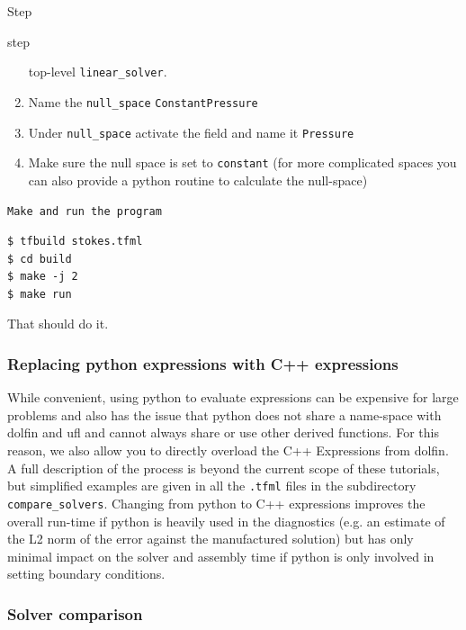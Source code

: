 \begin{steps}{Step}
\begin{steps}{step}
\begin{enumerate}
      top-level \texttt{linear\_solver}.
    \item Name the \texttt{null\_space} \texttt{ConstantPressure}
    \item Under \texttt{null\_space} activate the field and name it \texttt{Pressure}
    \item Make sure the null space is set to \texttt{constant} (for
      more complicated spaces you can also provide a python routine to
      calculate the null-space)
    \end{enumerate}
  \end{steps}
\item \texttt{Make and run the program}
  \begin{lstlisting}[style=bash]
$ tfbuild stokes.tfml
$ cd build
$ make -j 2 
$ make run
\end{lstlisting}


\end{steps}

That should do it.  

\subsubsection{Replacing python expressions with C++ expressions}

While convenient, using python to evaluate expressions can be
expensive for large problems and also has the issue that python does
not share a name-space with dolfin and ufl and cannot always share or
use other derived functions.  For this reason, we also allow you to
directly overload the C++ Expressions from dolfin.  A full description
of the process is beyond the current scope of these tutorials, but
simplified examples are given in all the \texttt{.tfml} files in the
subdirectory \texttt{compare\_solvers}. Changing from
python to C++ expressions improves the overall run-time if python is
heavily used in the diagnostics (e.g. an estimate of the L2 norm of
the error against the manufactured solution) but has only minimal
impact on the solver and assembly time if python is only involved in
setting boundary conditions.

\subsubsection{Solver comparison}
\label{sec:solver-comparison}

